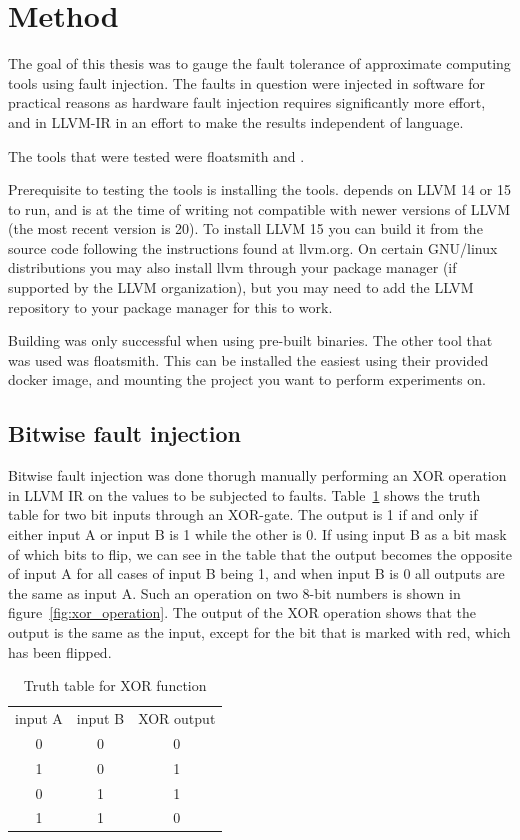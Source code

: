 \section{Method}

The goal of this thesis was to gauge the fault tolerance of approximate computing tools using fault injection. The faults in question were injected in software for practical reasons as hardware fault injection requires significantly more effort, and in LLVM-IR in an effort to make the results independent of language.

The tools that were tested were floatsmith and \taffo{}.

Prerequisite to testing the tools is installing the tools. \taffo{} depends on LLVM 14 or 15 to run, and is at the time of writing not compatible with newer versions of LLVM (the most recent version is 20). To install LLVM 15 you can build it from the source code following the instructions found at llvm.org. On certain GNU/linux distributions you may also install llvm through your package manager (if supported by the LLVM organization), but you may need to add the LLVM repository  to your package manager for this to work. 

Building \taffo{} was only successful when using pre-built binaries. 
The other tool that was used was floatsmith. This can be installed the easiest using their provided docker image, and mounting the project you want to perform experiments on.

\subsection{Bitwise fault injection}
Bitwise fault injection was done thorugh manually performing an XOR operation in LLVM IR on the values to be subjected to faults. Table~\ref{table:xor_truth_table} shows the truth table for two bit inputs through an XOR-gate. The output is 1 if and only if either input A or input B is 1 while the other is 0. If using input B as a bit mask of which bits to flip, we can see in the table that the output becomes the opposite of input A for all cases of input B being 1, and when input B is 0 all outputs are the same as input A. Such an operation on two 8-bit numbers is shown in figure~\ref{fig:xor_operation}. The output of the XOR operation shows that the output is the same as the input, except for the bit that is marked with red, which has been flipped.

\begin{table}[htb]
    \centering
\caption{Truth table for XOR function}
    \label{table:xor_truth_table}
\begin{tabular}{c|c|c}\label{table:xor_truth_table}
     input A& input B& XOR output \\
     0&0&0\\
     1&0&1\\
     0&1&1\\
     1&1&0
\end{tabular}
    
\end{table}



